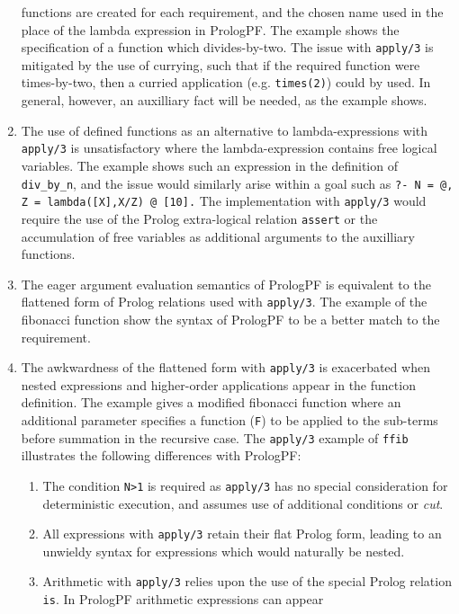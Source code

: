\begin{enumerate}
{  functions are created for each requirement, and the chosen name used in the place
  of the lambda expression in PrologPF.  The example shows the specification of
  a function which divides-by-two.  The issue with \texttt{apply/3} is mitigated by
  the use of currying, such that if the required function were times-by-two, then
  a curried application (e.g. \texttt{times(2)}) could by used.  In general, however,
  an auxilliary fact will be needed, as the example shows.}
\item{The use of defined functions as an alternative to lambda-expressions with
  \texttt{apply/3} is unsatisfactory where the lambda-expression contains free
  logical
  variables.  The example shows such an expression in the definition of
  \texttt{div\_{}by\_{}n}, and the issue would similarly arise within a goal
  such as \texttt{?- N = @, Z = lambda([X],X/Z) @ [10].}  The implementation with
  \texttt{apply/3} would require the use of the Prolog extra-logical relation
  \texttt{assert} or the accumulation of free variables as additional arguments to
  the auxilliary functions.}
\item{The eager argument evaluation semantics of PrologPF is equivalent to
  the flattened form of Prolog relations used with \texttt{apply/3}.  The
  example of the fibonacci function show the syntax of PrologPF to be a better
  match to the requirement.}
\item{The awkwardness of the flattened form with \texttt{apply/3} is exacerbated
  when nested expressions and higher-order applications appear in the
  function definition.  The example gives a modified fibonacci function where an
  additional parameter specifies a function (\texttt{F}) to be applied to the
  sub-terms before summation in the recursive case.  The \texttt{apply/3} example
  of \texttt{ffib} illustrates the following differences with PrologPF:
  \begin{enumerate}
  \item{The condition \texttt{N>1} is required as \texttt{apply/3} has no
    special consideration for deterministic execution, and assumes use of 
    additional conditions or \textit{cut}.}
  \item{All expressions with \texttt{apply/3} retain their flat Prolog form,
    leading to an unwieldy syntax for expressions which would naturally be
    nested.}
  \item{Arithmetic with \texttt{apply/3} relies upon the use of the special
    Prolog relation \texttt{is}.  In PrologPF arithmetic expressions can appear
}
\end{enumerate}}
\end{enumerate}
